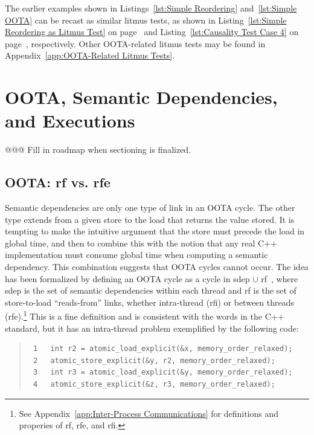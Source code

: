 \documentclass[10]{article}
\begin{document}
The earlier examples shown in
Listings~\ref{lst:Simple Reordering}
and~\ref{lst:Simple OOTA}
can be recast as similar  litmus tests, as shown in
Listing~\ref{lst:Simple Reordering as Litmus Test}
on page~\pageref{lst:Simple Reordering as Litmus Test}
and Listing~\ref{lst:Causality Test Case 4}
on page~\pageref{lst:Causality Test Case 4}, respectively.
Other OOTA-related litmus tests may be found in
Appendix~\ref{app:OOTA-Related Litmus Tests}.

\section{OOTA, Semantic Dependencies, and Executions}
\label{sec:OOTA; Semantic Dependencies; and Executions}

@@@ Fill in roadmap when sectioning is finalized.

\subsection{OOTA: rf vs. rfe}
\label{sec:OOTA: rf vs. rfe}

Semantic dependencies are only one type of link in an OOTA cycle.
The other type extends from a given store to the load that returns the
value stored.
It is tempting to make the intuitive argument that the store must precede
the load in global time, and then to combine this with the notion that
any real C++ implementation must consume global time when computing a
semantic dependency.
This combination suggests that OOTA cycles cannot occur.
The idea has been formalized by defining an OOTA cycle as a cycle
in sdep $\cup$ rf~\cite{PaulEMcKenney2014OOTA},
where sdep is the set of semantic dependencies within
each thread and rf is the set of store-to-load ``reads-from'' links,
whether intra-thread
(rfi) or between threads (rfe).\footnote{
	See Appendix~\ref{app:Inter-Process Communications} for definitions
	and properies of rf, rfe, and rfi.}
This is a fine definition and is consistent with the words in the C++
standard, but it has an intra-thread problem exemplified by the following
code:

\begin{quote}
\scriptsize
\begin{verbatim}
 1   int r2 = atomic_load_explicit(&x, memory_order_relaxed);
 2   atomic_store_explicit(&y, r2, memory_order_relaxed);
 3   int r3 = atomic_load_explicit(&y, memory_order_relaxed);
 4   atomic_store_explicit(&z, r3, memory_order_relaxed);
\end{verbatim}
\end{quote}
\end{document}
